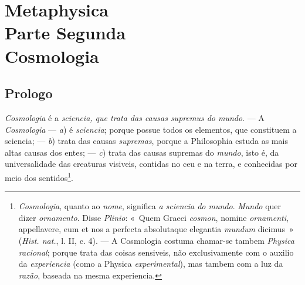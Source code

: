 \ifdefined\pg\else{}\fi


\part*{Metaphysica\\ Parte Segunda\\ Cosmologia}

\chapter*{Prologo}

 \emph{Cosmologia} é a \emph{sciencia, que trata das causas supremus
do mundo}. --- A \emph{Cosmologia} --- \emph{a}) é \emph{sciencia}; porque possue todos os
elementos, que constituem a sciencia; --- \emph{b}) trata das causas \emph{supremas},
porque a Philosophia estuda as mais altas causas dos entes; --- \emph{c}) trata das causas
supremas do \emph{mundo}, isto é, da universalidade das creaturas visiveis, contidas no
ceu e na terra, e conhecidas por meio dos sentidos\footnote{\emph{Cosmologia}, quanto ao
\emph{nome}, significa \emph{a sciencia do mundo}. \emph{Mundo} quer dizer
\emph{ornamento}. Disse \emph{Plinio}: «~Quem Graeci \emph{cosmon}, nomine
\emph{ornamenti}, appellavere, eum et nos a perfecta absolutaque elegantia \emph{mundum}
dicimus~» (\emph{Hist. nat.}, l. II, c. 4). --- A Cosmologia costuma chamar-se tambem
\emph{Physica racional}; porque trata das coisas sensiveis, não exclusivamente com o
auxilio da \emph{experiencia} (como a Physica \emph{experimental}), mas tambem com a luz
da \emph{razão}, baseada na mesma experiencia.}.

